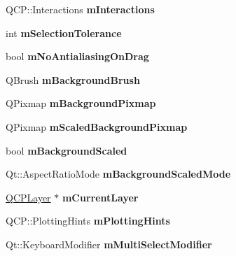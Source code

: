 \begin{DoxyCompactItemize}
\item 
\hypertarget{class_q_custom_plot_ad717377ceba7493b4b32f0bcbbdf1895}{}\label{class_q_custom_plot_ad717377ceba7493b4b32f0bcbbdf1895} 
Q\+C\+P\+::\+Interactions {\bfseries m\+Interactions}
\item 
\hypertarget{class_q_custom_plot_abc36e12dd0482117ad810a800c847722}{}\label{class_q_custom_plot_abc36e12dd0482117ad810a800c847722} 
int {\bfseries m\+Selection\+Tolerance}
\item 
\hypertarget{class_q_custom_plot_ac83df968435f6b8ec79f2993ab9124e8}{}\label{class_q_custom_plot_ac83df968435f6b8ec79f2993ab9124e8} 
bool {\bfseries m\+No\+Antialiasing\+On\+Drag}
\item 
\hypertarget{class_q_custom_plot_a3aef5de4ac012178e3293248e9c63737}{}\label{class_q_custom_plot_a3aef5de4ac012178e3293248e9c63737} 
Q\+Brush {\bfseries m\+Background\+Brush}
\item 
\hypertarget{class_q_custom_plot_ae8f4677399324a78c5f8dbfb95a34f90}{}\label{class_q_custom_plot_ae8f4677399324a78c5f8dbfb95a34f90} 
Q\+Pixmap {\bfseries m\+Background\+Pixmap}
\item 
\hypertarget{class_q_custom_plot_a081bf046501d52642dc6d7e3bdb97d57}{}\label{class_q_custom_plot_a081bf046501d52642dc6d7e3bdb97d57} 
Q\+Pixmap {\bfseries m\+Scaled\+Background\+Pixmap}
\item 
\hypertarget{class_q_custom_plot_a62fe584b20680b1b2e1c7efb5c5416a5}{}\label{class_q_custom_plot_a62fe584b20680b1b2e1c7efb5c5416a5} 
bool {\bfseries m\+Background\+Scaled}
\item 
\hypertarget{class_q_custom_plot_ab82e8a5e3ad6b486f95d6da8bf49e9aa}{}\label{class_q_custom_plot_ab82e8a5e3ad6b486f95d6da8bf49e9aa} 
Qt\+::\+Aspect\+Ratio\+Mode {\bfseries m\+Background\+Scaled\+Mode}
\item 
\hypertarget{class_q_custom_plot_aa27569c92e74395af10151357d268628}{}\label{class_q_custom_plot_aa27569c92e74395af10151357d268628} 
\hyperlink{class_q_c_p_layer}{Q\+C\+P\+Layer} $\ast$ {\bfseries m\+Current\+Layer}
\item 
\hypertarget{class_q_custom_plot_aa184197a6101a9cc5807469e1d006c9e}{}\label{class_q_custom_plot_aa184197a6101a9cc5807469e1d006c9e} 
Q\+C\+P\+::\+Plotting\+Hints {\bfseries m\+Plotting\+Hints}
\item 
\hypertarget{class_q_custom_plot_a0e97e701c5671e7e463d2ce0211d0f8a}{}\label{class_q_custom_plot_a0e97e701c5671e7e463d2ce0211d0f8a} 
Qt\+::\+Keyboard\+Modifier {\bfseries m\+Multi\+Select\+Modifier}
\item 

\end{DoxyCompactItemize}
